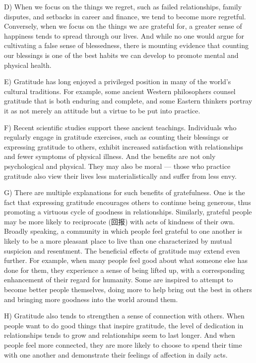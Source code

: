 \documentclass[UTF8,11pt]{ctexart}
\begin{document}
D) When we focus on the things we regret, such as failed relationships, family disputes, and setbacks in career and finance, we tend to become more regretful. Conversely, when we focus on the things we are grateful for, a greater sense of happiness tends to spread through our lives. And while no one would argue for cultivating a false sense of blessedness, there is mounting evidence that counting our blessings is one of the best habits we can develop to promote mental and physical health.


E) Gratitude has long enjoyed a privileged position in many of the world’s cultural traditions. For example, some ancient Western philosophers counsel gratitude that is both enduring and complete, and some Eastern thinkers portray it as not merely an attitude but a virtue to be put into practice.


F) Recent scientific studies support these ancient teachings. Individuals who regularly engage in gratitude exercises, such as counting their blessings or expressing gratitude to others, exhibit increased satisfaction with relationships and fewer symptoms of physical illness. And the benefits are not only psychological and physical. They may also be moral — those who practice gratitude also view their lives less materialistically and suffer from less envy.


G) There are multiple explanations for such benefits of gratefulness. One is the fact that expressing gratitude encourages others to continue being generous, thus promoting a virtuous cycle of goodness in relationships. Similarly, grateful people may be more likely to reciprocate (回报) with acts of kindness of their own. Broadly speaking, a community in which people feel grateful to one another is likely to be a more pleasant place to live than one characterized by mutual suspicion and resentment. The beneficial effects of gratitude may extend even further. For example, when many people feel good about what someone else has done for them, they experience a sense of being lifted up, with a corresponding enhancement of their regard for humanity. Some are inspired to attempt to become better people themselves, doing more to help bring out the best in others and bringing more goodness into the world around them.


H) Gratitude also tends to strengthen a sense of connection with others. When people want to do good things that inspire gratitude, the level of dedication in relationships tends to grow and relationships seem to last longer. And when people feel more connected, they are more likely to choose to spend their time with one another and demonstrate their feelings of affection in daily acts.
\end{document}
